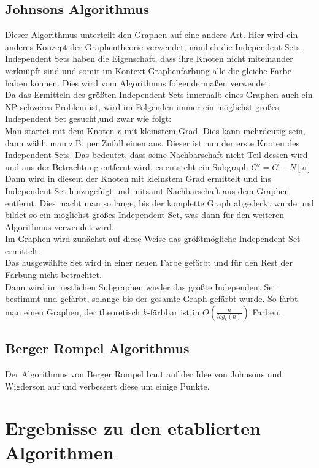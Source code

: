 \documentclass[11pt]{article}
\begin{document}
\subsection{Johnsons Algorithmus} %

Dieser Algorithmus unterteilt den Graphen auf eine andere Art. Hier wird ein anderes Konzept der Graphentheorie verwendet, nämlich die Independent Sets. \\
Independent Sets haben die Eigenschaft, dass ihre Knoten nicht miteinander verknüpft sind und somit im Kontext Graphenfärbung alle die gleiche Farbe haben können.
Dies wird vom Algorithmus folgendermaßen verwendet: \\
Da das Ermitteln des größten Independent Sets innerhalb eines Graphen auch ein NP-schweres Problem ist, wird im Folgenden immer ein möglichst großes Independent Set gesucht,und zwar wie folgt: \\
Man startet mit dem Knoten $v$ mit kleinstem Grad. Dies kann mehrdeutig sein, dann wählt man z.B. per Zufall einen aus. Dieser ist nun der erste Knoten des Independent Sets. Das bedeutet, dass seine Nachbarschaft nicht Teil dessen wird und aus der Betrachtung entfernt wird, es entsteht ein Subgraph $G' = G - N[v]$
Dann wird in diesem der Knoten mit kleinstem Grad ermittelt und ins Independent Set hinzugefügt und mitsamt Nachbarschaft aus dem Graphen entfernt. Dies macht man so lange, bis der komplette Graph abgedeckt wurde und bildet so ein möglichst großes Independent Set, was dann für den weiteren Algorithmus verwendet wird. \\
Im Graphen wird zunächst auf diese Weise das größtmögliche Independent Set ermittelt. \\
Das ausgewählte Set wird in einer neuen Farbe gefärbt und für den Rest der Färbung nicht betrachtet. \\
Dann wird im restlichen Subgraphen wieder das größte Independent Set bestimmt und gefärbt, solange bis der gesamte Graph gefärbt wurde.
So färbt man einen Graphen, der theoretisch $k$-färbbar ist in $O(\frac{n}{log_k(n)})$ Farben.

\subsection{Berger Rompel Algorithmus} %

Der Algorithmus von Berger Rompel
baut auf der Idee von Johnsons und Wigderson auf
und verbessert diese um einige Punkte.
\cite{berger_rompel}

\section{Ergebnisse zu den etablierten Algorithmen} %
\end{document}
